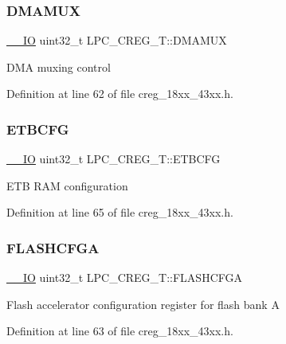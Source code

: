 \subsubsection{\texorpdfstring{D\+M\+A\+M\+UX}{DMAMUX}}
{\footnotesize\ttfamily \hyperlink{core__sc300_8h_aec43007d9998a0a0e01faede4133d6be}{\+\_\+\+\_\+\+IO} uint32\+\_\+t L\+P\+C\+\_\+\+C\+R\+E\+G\+\_\+\+T\+::\+D\+M\+A\+M\+UX}

D\+MA muxing control 

Definition at line 62 of file creg\+\_\+18xx\+\_\+43xx.\+h.

\mbox{\label{struct_l_p_c___c_r_e_g___t_a733488544af409af58f32169c4e9e550}} 
\subsubsection{\texorpdfstring{E\+T\+B\+C\+FG}{ETBCFG}}
{\footnotesize\ttfamily \hyperlink{core__sc300_8h_aec43007d9998a0a0e01faede4133d6be}{\+\_\+\+\_\+\+IO} uint32\+\_\+t L\+P\+C\+\_\+\+C\+R\+E\+G\+\_\+\+T\+::\+E\+T\+B\+C\+FG}

E\+TB R\+AM configuration 

Definition at line 65 of file creg\+\_\+18xx\+\_\+43xx.\+h.

\mbox{\label{struct_l_p_c___c_r_e_g___t_a12dba9532c6bf169e7108b27ab9fec41}} 
\subsubsection{\texorpdfstring{F\+L\+A\+S\+H\+C\+F\+GA}{FLASHCFGA}}
{\footnotesize\ttfamily \hyperlink{core__sc300_8h_aec43007d9998a0a0e01faede4133d6be}{\+\_\+\+\_\+\+IO} uint32\+\_\+t L\+P\+C\+\_\+\+C\+R\+E\+G\+\_\+\+T\+::\+F\+L\+A\+S\+H\+C\+F\+GA}

Flash accelerator configuration register for flash bank A 

Definition at line 63 of file creg\+\_\+18xx\+\_\+43xx.\+h.

